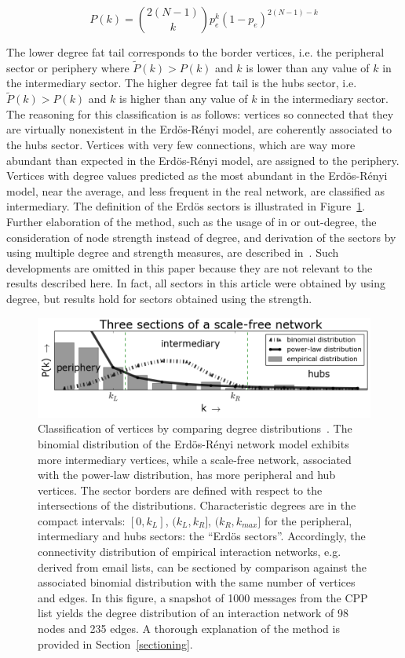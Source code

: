 \documentclass[review]{elsarticle}
\begin{document}
\begin{equation}
P(k)=\binom{2(N-1)}{k}p_e^k(1-p_e)^{2(N-1)-k}
\end{equation}

The lower degree fat tail corresponds to the border vertices,
i.e. the peripheral sector or periphery where $\widetilde{P}(k)>P(k)$ and $k$
is lower than any value of $k$ in the intermediary sector.
The higher degree fat tail is the hubs sector,
i.e. $\widetilde{P}(k)>P(k)$ and $k$ is higher than any value of $k$ in the intermediary sector.
The reasoning for this classification is as follows:
vertices so connected that they are virtually nonexistent in the Erd\"os-R\'enyi model, are coherently associated to the hubs sector.
Vertices with very few connections, which are way more abundant than expected in the Erd\"os-R\'enyi model,
are assigned to the periphery.
Vertices with degree values predicted as the most abundant in the Erd\"os-R\'enyi model,
near the average, and less frequent in the real network, are classified as intermediary.
The definition of the Erdös sectors is illustrated in Figure~\ref{fig:setores}.
Further elaboration of the method, such as the usage of in or out-degree,
the consideration of node strength instead of degree,
and derivation of the sectors by using multiple degree and strength measures, are described in~\cite{stab}.
Such developments are omitted in this paper because they are not relevant to the results described here.
In fact, all sectors in this article were obtained by using degree,
but results hold for sectors obtained using the strength.

\clearpage
\begin{figure}[!h]
\centering
\includegraphics[width=\textwidth]{figs/fser__}
\caption{Classification of vertices by comparing degree
distributions~\cite{stab}.
The binomial distribution of the Erd\"os-R\'enyi network model exhibits more intermediary vertices, while a scale-free network, associated with the power-law distribution, has more peripheral and hub vertices. The sector borders are defined with respect to the intersections of the distributions. Characteristic degrees are in the compact intervals: $[0,k_L]$, $(k_L,k_R]$, $(k_R,k_{max}]$ for the peripheral, intermediary and hubs sectors: the ``Erd\"os sectors''.
Accordingly, the connectivity distribution of empirical interaction networks, e.g. derived from email lists, can be sectioned by comparison against the associated binomial distribution with the same number of vertices and edges. In this figure, a snapshot of 1000 messages from the CPP list yields the degree distribution of an interaction network of 98 nodes and 235 edges. A thorough explanation of the method is provided in Section~\ref{sectioning}.}
\label{fig:setores}
\end{figure}
\end{document}
